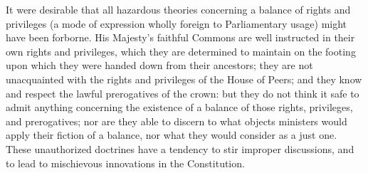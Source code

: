 It were desirable that all hazardous theories concerning a balance of rights and privileges (a mode of expression wholly foreign to Parliamentary usage) might have been forborne. His Majesty's faithful Commons are well instructed in their own rights and privileges, which they are determined to maintain on the footing upon which they were handed down from their ancestors; they are not unacquainted with the rights and privileges of the House of Peers; and they know and respect the lawful prerogatives of the crown: but they do not think it safe to admit anything concerning the existence of a balance of those rights, privileges, and prerogatives; nor are they able to discern to what objects ministers would apply their fiction of a balance, nor what they would consider as a just one. These unauthorized doctrines have a tendency to stir improper discussions, and to lead to mischievous innovations in the Constitution. 

